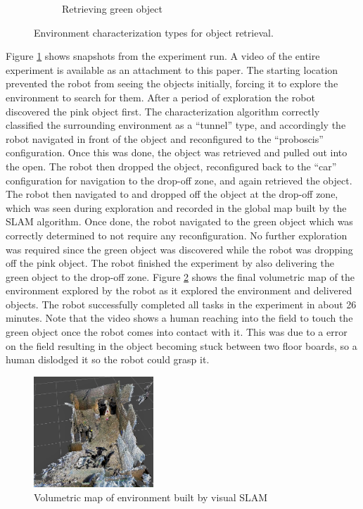 \documentclass[conference]{IEEEtran}
\begin{document}
\begin{figure}[t]
\begin{subfigure}[t]{0.32\textwidth}
        \caption{Retrieving green object}
    \end{subfigure}
      \caption{Environment characterization types for object retrieval.}
      \label{fig:demo}
   \end{figure}




Figure \ref{fig:demo} shows snapshots from the experiment run. A video of the entire experiment is available as an attachment to this paper. The starting location prevented the robot from seeing the objects initially, forcing it to explore the environment to search for them. After a period of exploration the robot discovered the pink object first. The characterization algorithm correctly classified the surrounding environment as a ``tunnel'' type, and accordingly the robot navigated in front of the object and reconfigured to the ``proboscis'' configuration. Once this was done, the object was retrieved and pulled out into the open. The robot then dropped the object, reconfigured back to the ``car'' configuration for navigation to the drop-off zone, and again retrieved the object. The robot then navigated to and dropped off the object at the drop-off zone, which was seen during exploration and recorded in the global map built by the SLAM algorithm. Once done, the robot navigated to the green object which was correctly determined to not require any reconfiguration. No further exploration was required since the green object was discovered while the robot was dropping off the pink object. The robot finished the experiment by also delivering the green object to the drop-off zone. Figure \ref{fig:octomap} shows the final volumetric map of the environment explored by the robot as it explored the environment and delivered objects. The robot successfully completed all tasks in the experiment in about 26 minutes. Note that the video shows a human reaching into the field to touch the green object once the robot comes into contact with it. This was due to a error on the field resulting in the object becoming stuck between two floor boards, so a human dislodged it so the robot could grasp it.

\begin{figure}
\begin{center}
\includegraphics[width=0.4\textwidth]{images/octomap.png}
\caption{Volumetric map of environment built by visual SLAM}
\label{fig:octomap}
\end{center}
\end{figure}
\end{document}
